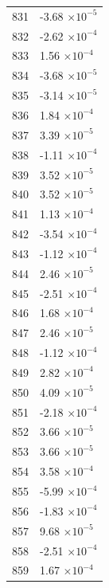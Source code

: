 \documentclass[a4paper,11pt]{article}
\begin{document}
\begin{center}
\begin{longtable}{|R{1.5cm}|R{2.5cm}|}
  831 &        -3.68 $\times 10^{          -5}$ \\
  832 &        -2.62 $\times 10^{          -4}$ \\
  833 &         1.56 $\times 10^{          -4}$ \\
  834 &        -3.68 $\times 10^{          -5}$ \\
  835 &        -3.14 $\times 10^{          -5}$ \\
  836 &         1.84 $\times 10^{          -4}$ \\
  837 &         3.39 $\times 10^{          -5}$ \\
  838 &        -1.11 $\times 10^{          -4}$ \\
  839 &         3.52 $\times 10^{          -5}$ \\
  840 &         3.52 $\times 10^{          -5}$ \\
  841 &         1.13 $\times 10^{          -4}$ \\
  842 &        -3.54 $\times 10^{          -4}$ \\
  843 &        -1.12 $\times 10^{          -4}$ \\
  844 &         2.46 $\times 10^{          -5}$ \\
  845 &        -2.51 $\times 10^{          -4}$ \\
  846 &         1.68 $\times 10^{          -4}$ \\
  847 &         2.46 $\times 10^{          -5}$ \\
  848 &        -1.12 $\times 10^{          -4}$ \\
  849 &         2.82 $\times 10^{          -4}$ \\
  850 &         4.09 $\times 10^{          -5}$ \\
  851 &        -2.18 $\times 10^{          -4}$ \\
  852 &         3.66 $\times 10^{          -5}$ \\
  853 &         3.66 $\times 10^{          -5}$ \\
  854 &         3.58 $\times 10^{          -4}$ \\
  855 &        -5.99 $\times 10^{          -4}$ \\
  856 &        -1.83 $\times 10^{          -4}$ \\
  857 &         9.68 $\times 10^{          -5}$ \\
  858 &        -2.51 $\times 10^{          -4}$ \\
  859 &         1.67 $\times 10^{          -4}$ \\

\end{longtable}
\end{center}
\end{document}
